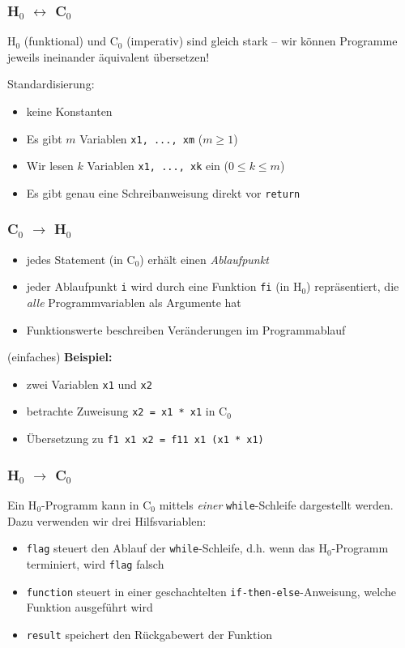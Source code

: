 \documentclass{beamer}
\begin{document}
\begin{frame} \frametitle{H${}_\text{0}$ $\leftrightarrow$ C${}_\text{0}$}
	H${}_\text{0}$ (funktional) und C${}_\text{0}$ (imperativ) sind gleich stark -- wir können Programme jeweils ineinander äquivalent übersetzen!
	
	Standardisierung: 
	\begin{itemize}
		\item keine Konstanten
		\item Es gibt $m$ Variablen \texttt{x1, ..., xm} ($m \ge 1$)
		\item Wir lesen $k$ Variablen \texttt{x1, ..., xk} ein ($0 \le k \le m$)
		\item Es gibt genau eine Schreibanweisung direkt vor \texttt{return}
	\end{itemize}
\end{frame}

\begin{frame} \frametitle{C${}_\text{0}$ $\to$ H${}_\text{0}$}
	\begin{itemize}
		\item jedes Statement (in C${}_\text{0}$) erhält einen \textit{Ablaufpunkt}
		\item jeder Ablaufpunkt \texttt{i} wird durch eine Funktion \texttt{fi} (in H${}_\text{0}$) repräsentiert, die \textit{alle} Programmvariablen als Argumente hat
		\item Funktionswerte beschreiben Veränderungen im Programmablauf
	\end{itemize}

	(einfaches) \textbf{Beispiel:} 
	\begin{itemize}
		\item zwei Variablen \texttt{x1} und \texttt{x2}
		\item betrachte Zuweisung \texttt{x2 = x1 * x1} in C${}_\text{0}$
		\item Übersetzung zu \texttt{f1 x1 x2 = f11 x1 (x1 * x1)}
	\end{itemize}
\end{frame}


\begin{frame} \frametitle{H${}_\text{0}$ $\to$ C${}_\text{0}$}
	Ein H${}_\text{0}$-Programm kann in C${}_\text{0}$ mittels \textit{einer} \texttt{while}-Schleife dargestellt werden. Dazu verwenden wir drei Hilfsvariablen:
	\begin{itemize}
		\item \texttt{flag} steuert den Ablauf der \texttt{while}-Schleife, d.h. wenn das H${}_\text{0}$-Programm terminiert, wird \texttt{flag} falsch
		\item \texttt{function} steuert in einer geschachtelten \texttt{if-then-else}-Anweisung, welche Funktion ausgeführt wird
		\item \texttt{result} speichert den Rückgabewert der Funktion
	\end{itemize}
\end{frame}
\end{document}
